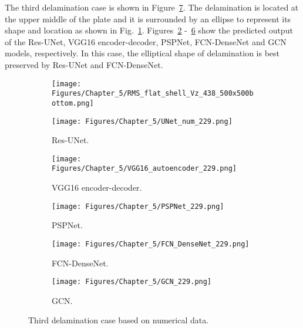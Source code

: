 
The third delamination case is shown in Figure~\ref{fig:rms_third_case}. 
The delamination is located at the upper middle of the plate and it is surrounded by an ellipse to represent its shape and location as shown in Fig.~\ref{fig:RMS_bottom_438}.
Figures~\ref{fig:unet_229} -~\ref{fig:gcn_229} show the predicted output of the Res-UNet, VGG16 encoder-decoder, PSPNet, FCN-DenseNet and GCN models, respectively. 
In this case, the elliptical shape of delamination is best preserved by Res-UNet and FCN-DenseNet. 
\begin{figure} [!h]
	\centering
	\begin{subfigure}[b]{.48\textwidth}
		\centering
		\texttt{[image: Figures/Chapter\_5/RMS\_flat\_shell\_Vz\_438\_500x500bottom.png]}
		\caption{}
		\label{fig:RMS_bottom_438}
	\end{subfigure}
	\hfill
	\begin{subfigure}[b]{.48\textwidth}
		\centering
		\texttt{[image: Figures/Chapter\_5/UNet\_num\_229.png]}
		\caption{Res-UNet.}
		\label{fig:unet_229}	
	\end{subfigure}
	\hfill
	\begin{subfigure}[b]{.48\textwidth}
		\centering
		\texttt{[image: Figures/Chapter\_5/VGG16\_autoencoder\_229.png]}
		\caption{VGG16 encoder-decoder.}
		\label{fig:vgg16_229}
	\end{subfigure}
	\hfill
	\begin{subfigure}[b]{.48\textwidth}
		\centering
		\texttt{[image: Figures/Chapter\_5/PSPNet\_229.png]}
		\caption{PSPNet.}
		\label{fig:pspnet_229}	
	\end{subfigure}
	\hfill
	\begin{subfigure}[b]{.48\textwidth}
		\centering
		\texttt{[image: Figures/Chapter\_5/FCN\_DenseNet\_229.png]}
		\caption{FCN-DenseNet.}
		\label{fig:densenet_229}
	\end{subfigure}
	\hfill
	\begin{subfigure}[b]{.48\textwidth}
		\centering
		\texttt{[image: Figures/Chapter\_5/GCN\_229.png]}
		\caption{GCN.}
		\label{fig:gcn_229}	
	\end{subfigure}
	\caption{Third delamination case based on numerical data.}
	\label{fig:rms_third_case}
\end{figure}

